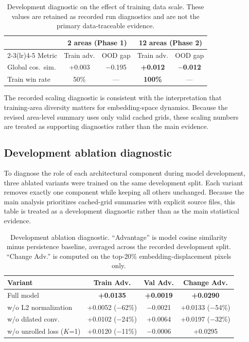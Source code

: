 \documentclass{article}
\begin{document}
\begin{table}[htbp]
\centering
\caption{Development diagnostic on the effect of training data scale. These values are retained as recorded run diagnostics and are not the primary data-traceable evidence.}
\label{tab:scaling}
\begin{tabular}{lcccc}
\toprule
 & \multicolumn{2}{c}{2 areas (Phase 1)} & \multicolumn{2}{c}{12 areas (Phase 2)} \\
\cmidrule(lr){2-3}\cmidrule(lr){4-5}
Metric & Train adv. & OOD gap & Train adv. & OOD gap \\
\midrule
Global cos.~sim. & +0.003 & $-$0.195 & \textbf{+0.012} & $\mathbf{-}$\textbf{0.012} \\
Train win rate & 50\% & --- & \textbf{100\%} & --- \\
\bottomrule
\end{tabular}
\end{table}

The recorded scaling diagnostic is consistent with the interpretation that training-area diversity matters for embedding-space dynamics. Because the revised area-level summary uses only valid cached grids, these scaling numbers are treated as supporting diagnostics rather than the main evidence.

\subsection{Development ablation diagnostic}
\label{sec:ablation}

To diagnose the role of each architectural component during model development, three ablated variants were trained on the same development split. Each variant removes exactly one component while keeping all others unchanged. Because the main analysis prioritizes cached-grid summaries with explicit source files, this table is treated as a development diagnostic rather than as the main statistical evidence.

\begin{table}[htbp]
\centering
\caption{Development ablation diagnostic. ``Advantage'' is model cosine similarity minus persistence baseline, averaged across the recorded development split. ``Change Adv.'' is computed on the top-20\% embedding-displacement pixels only.}
\label{tab:ablation}
\begin{tabular}{lccc}
\toprule
Variant & Train Adv. & Val Adv. & Change Adv. \\
\midrule
Full model & \textbf{+0.0135} & \textbf{+0.0019} & \textbf{+0.0290} \\
w/o L2 normalization & +0.0052 ($-$62\%) & $-$0.0021 & +0.0133 ($-$54\%) \\
w/o dilated conv. & +0.0102 ($-$24\%) & +0.0064 & +0.0197 ($-$32\%) \\
w/o unrolled loss ($K$=1) & +0.0120 ($-$11\%) & $-$0.0006 & +0.0295 \\
\bottomrule
\end{tabular}
\end{table}
\end{document}

